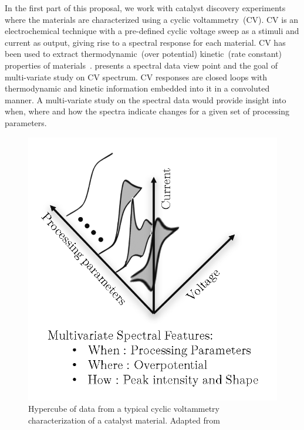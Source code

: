 In the first part of this proposal, we work with catalyst discovery experiments where the materials are characterized using a cyclic voltammetry~(CV). CV is an electrochemical technique with a pre-defined cyclic voltage sweep as a stimuli and current as output, giving rise to a spectral response for each material. CV has been used to extract thermodynamic~(over potential) kinetic~(rate constant) properties of materials~\cite{martin2016qualitative,rountree2014evaluation,haber2014high}.  presents a spectral data view point and the goal of multi-variate study on CV spectrum. CV responses are closed loops with thermodynamic and kinetic information embedded into it in a convoluted manner. A multi-variate study on the spectral data would provide insight into when, where and how the spectra indicate changes for a given set of processing parameters.

\begin{figure}[h!]
    \centering
    \includegraphics[width=0.45\columnwidth]{figures/spectral_hypercube.png}
    \caption{Hypercube of data from a typical cyclic voltammetry characterization of a catalyst material. Adapted from~\cite{rajan2013informatics}}
    \label{fig:spectrahypercube}
\end{figure}


